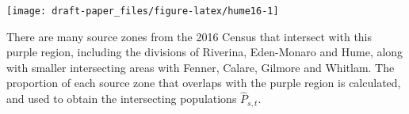 \documentclass[11pt,a4paper,]{article}
\let\origfigure\figure
\let\endorigfigure\endfigure
\renewenvironment{figure}[1][2] {
    \expandafter\origfigure\expandafter[H]
} {
    \endorigfigure
}
\begin{document}
\begin{figure}[h]

{\centering \texttt{[image: draft-paper\_files/figure-latex/hume16-1]} 

}

\caption{Census division boundaries in NSW for 2016, with the 2013 electoral boundary for Hume, shown in purple. The purple region is not contained within a single Census division.}\label{fig:hume16}
\end{figure}

There are many source zones from the 2016 Census that intersect with this purple region, including the divisions of Riverina, Eden-Monaro and Hume, along with smaller intersecting areas with Fenner, Calare, Gilmore and Whitlam. The proportion of each source zone that overlaps with the purple region is calculated, and used to obtain the intersecting populations \(\hat{P}_{s,t}\).

\footnotesize
\end{document}
